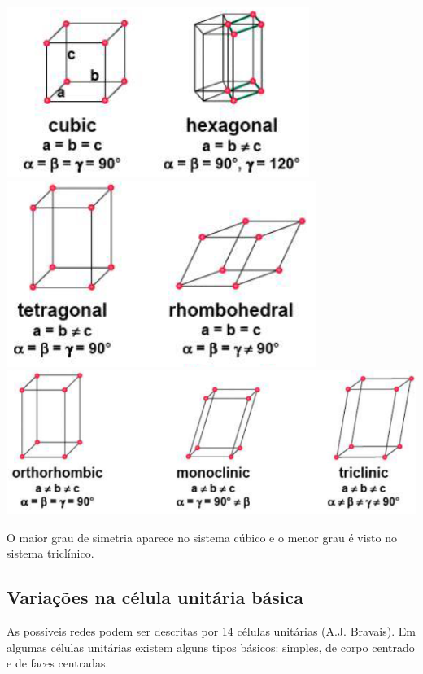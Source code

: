 \includegraphics[scale=0.5,trim={0 0 0 0}]{figures/crist1.png}
\includegraphics[scale=0.5,trim={0 0 0 0}]{figures/crist2.png}
\includegraphics[scale=0.3,trim={0 0 0 0}]{figures/crist3.png}


O maior grau de simetria aparece no sistema cúbico e o menor grau é visto no sistema triclínico.

\subsection*{Variações na célula unitária básica}

As possíveis redes podem ser descritas por 14 células unitárias (A.J. Bravais).
Em algumas células unitárias existem alguns tipos básicos: simples, de corpo centrado e de faces centradas.
 
